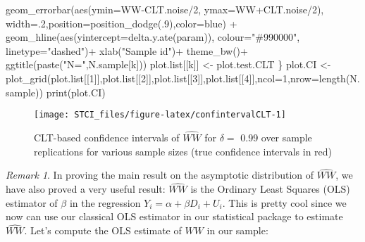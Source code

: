 \documentclass[
]{book}
\newenvironment{Shaded}{\begin{snugshade}}{\end{snugshade}}
\newcommand{\AttributeTok}[1]{\textcolor[rgb]{0.77,0.63,0.00}{#1}}
\newcommand{\DecValTok}[1]{\textcolor[rgb]{0.00,0.00,0.81}{#1}}
\newcommand{\FunctionTok}[1]{\textcolor[rgb]{0.00,0.00,0.00}{#1}}
\newcommand{\NormalTok}[1]{#1}
\newcommand{\OtherTok}[1]{\textcolor[rgb]{0.56,0.35,0.01}{#1}}
\newcommand{\SpecialCharTok}[1]{\textcolor[rgb]{0.00,0.00,0.00}{#1}}
\newcommand{\StringTok}[1]{\textcolor[rgb]{0.31,0.60,0.02}{#1}}
\theoremstyle{definition}
\theoremstyle{definition}
\theoremstyle{definition}
\theoremstyle{definition}
\theoremstyle{remark}
\newtheorem*{remark}{Remark}
\begin{document}
\begin{Shaded}
\begin{Highlighting}[]
      \FunctionTok{geom\_errorbar}\NormalTok{(}\FunctionTok{aes}\NormalTok{(}\AttributeTok{ymin=}\NormalTok{WW}\SpecialCharTok{{-}}\NormalTok{CLT.noise}\SpecialCharTok{/}\DecValTok{2}\NormalTok{, }\AttributeTok{ymax=}\NormalTok{WW}\SpecialCharTok{+}\NormalTok{CLT.noise}\SpecialCharTok{/}\DecValTok{2}\NormalTok{), }\AttributeTok{width=}\NormalTok{.}\DecValTok{2}\NormalTok{,}\AttributeTok{position=}\FunctionTok{position\_dodge}\NormalTok{(.}\DecValTok{9}\NormalTok{),}\AttributeTok{color=}\StringTok{\textquotesingle{}blue\textquotesingle{}}\NormalTok{) }\SpecialCharTok{+}
      \FunctionTok{geom\_hline}\NormalTok{(}\FunctionTok{aes}\NormalTok{(}\AttributeTok{yintercept=}\FunctionTok{delta.y.ate}\NormalTok{(param)), }\AttributeTok{colour=}\StringTok{"\#990000"}\NormalTok{, }\AttributeTok{linetype=}\StringTok{"dashed"}\NormalTok{)}\SpecialCharTok{+}
      \FunctionTok{xlab}\NormalTok{(}\StringTok{"Sample id"}\NormalTok{)}\SpecialCharTok{+}
      \FunctionTok{theme\_bw}\NormalTok{()}\SpecialCharTok{+}
      \FunctionTok{ggtitle}\NormalTok{(}\FunctionTok{paste}\NormalTok{(}\StringTok{"N="}\NormalTok{,N.sample[k]))}
\NormalTok{  plot.list[[k]] }\OtherTok{\textless{}{-}}\NormalTok{ plot.test.CLT}
\NormalTok{\}}
\NormalTok{plot.CI }\OtherTok{\textless{}{-}} \FunctionTok{plot\_grid}\NormalTok{(plot.list[[}\DecValTok{1}\NormalTok{]],plot.list[[}\DecValTok{2}\NormalTok{]],plot.list[[}\DecValTok{3}\NormalTok{]],plot.list[[}\DecValTok{4}\NormalTok{]],}\AttributeTok{ncol=}\DecValTok{1}\NormalTok{,}\AttributeTok{nrow=}\FunctionTok{length}\NormalTok{(N.sample))}
\FunctionTok{print}\NormalTok{(plot.CI)}
\end{Highlighting}
\end{Shaded}

\begin{figure}[htbp]

{\centering \texttt{[image: STCI\_files/figure-latex/confintervalCLT-1]} 

}

\caption{CLT-based confidence intervals of $\hat{WW}$ for $\delta=$ 0.99 over sample replications for various sample sizes (true confidence intervals in red)}\label{fig:confintervalCLT}
\end{figure}

\begin{remark}
\iffalse{} {Remark. } \fi{}In proving the main result on the asymptotic distribution of \(\hat{WW}\), we have also proved a very useful result: \(\hat{WW}\) is the Ordinary Least Squares (OLS) estimator of \(\beta\) in the regression \(Y_i=\alpha+\beta D_i + U_i\).
This is pretty cool since we now can use our classical OLS estimator in our statistical package to estimate \(\hat{WW}\).
Let's compute the OLS estimate of \(WW\) in our sample:
\end{remark}
\end{document}
